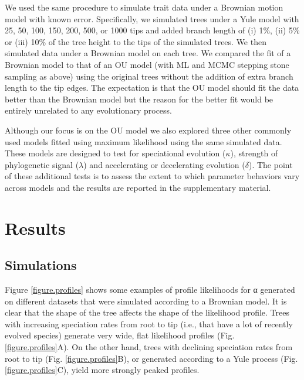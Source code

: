 \documentclass[a4paper,12pt]{article}
\begin{document}
We used the same procedure to simulate trait data under a Brownian motion model with known error. Specifically, we simulated trees under a Yule model with 25, 50, 100, 150, 200, 500, or 1000 tips and added branch length of (i) 1\%, (ii) 5\% or (iii) 10\% of the tree height to the tips of the simulated trees. We then simulated data under a Brownian model on each tree. We compared the fit of a Brownian model to that of an OU model (with ML and MCMC stepping stone sampling as above) using the original trees without the addition of extra branch length to the tip edges. The expectation is that the OU model should fit the data better than the Brownian model but the reason for the better fit would be entirely unrelated to any evolutionary process. 

Although our focus is on the OU model we also explored three other commonly used models \citep[$\kappa$, $\lambda$, and $\delta$;][]{Pagel:1997aa,Pagel:1999aa} fitted using maximum likelihood using the same simulated data. These models are designed to test for speciational evolution ($\kappa$), strength of phylogenetic signal ($\lambda$) and accelerating or decelerating evolution ($\delta$). The point of these additional tests is to assess the extent to which parameter behaviors vary across models and the results are reported in the supplementary material. 


\section{Results}
\subsection{Simulations}
\label{section:sims.results} 
Figure \ref{figure.profiles} shows some examples of profile likelihoods for α generated on different datasets that were simulated according to a Brownian model. It is clear that the shape of the tree affects the shape of the likelihood profile. Trees with increasing speciation rates from root to tip (i.e., that have a lot of recently evolved species) generate very wide, flat likelihood profiles (Fig. \ref{figure.profiles}A). On the other hand, trees with declining speciation rates from root to tip (Fig. \ref{figure.profiles}B), or generated according to a Yule process (Fig. \ref{figure.profiles}C), yield more strongly peaked profiles. 
\end{document}
